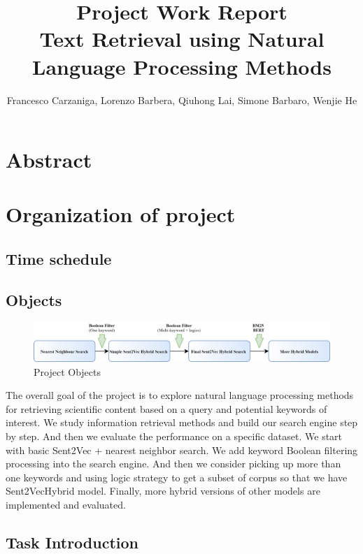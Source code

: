 \documentclass[10pt,a4paper,fleqn]{report}
\begin{document}
\title{Project Work Report \\
	Text Retrieval using Natural Language Processing Methods}
\author{Francesco Carzaniga, 
		Lorenzo Barbera, 
		Qiuhong Lai, 
		Simone Barbaro, 	
		Wenjie He}

\maketitle
\tableofcontents

\chapter*{Abstract}

\chapter{Organization of project}
	\section{Time schedule} 
	
	\section{Objects}
			
		\begin{figure}
			\centering
			\includegraphics[width=\linewidth]{figure/Object}
			\caption{Project Objects}
			\label{fig:object}
		\end{figure}
			
		The overall goal of the project is to explore natural language processing methods for retrieving scientific content based on a query and potential keywords of interest. We study information retrieval methods and build our search engine step by step. And then we evaluate the performance on a specific dataset.
		We start with basic Sent2Vec + nearest neighbor search. We add keyword Boolean filtering processing into the search engine. And then we consider picking up more than one keywords and using logic strategy to get a subset of corpus so that we have Sent2VecHybrid model. Finally, more hybrid versions of other models are implemented and evaluated.
		
	\section{Task Introduction}	
	
\end{document}

